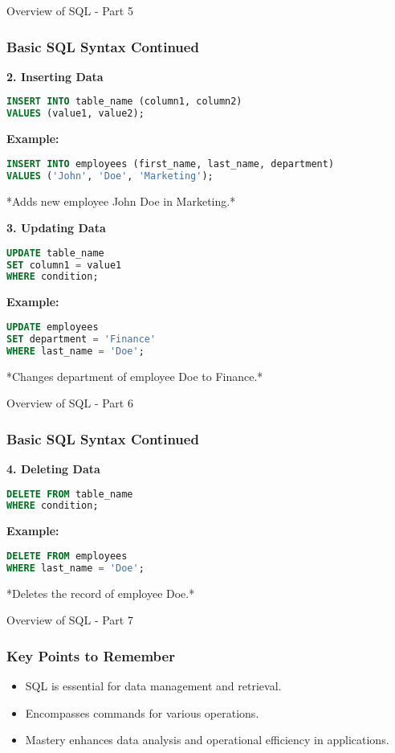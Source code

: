 \documentclass[aspectratio=169]{beamer}
\begin{document}
\begin{frame}[fragile]{Overview of SQL - Part 5}
    \frametitle{Basic SQL Syntax Continued}

    \textbf{2. Inserting Data}
    \begin{lstlisting}[language=SQL]
INSERT INTO table_name (column1, column2) 
VALUES (value1, value2);
    \end{lstlisting}

    \textbf{Example:}
    \begin{lstlisting}[language=SQL]
INSERT INTO employees (first_name, last_name, department) 
VALUES ('John', 'Doe', 'Marketing');
    \end{lstlisting}
    *Adds new employee John Doe in Marketing.*

    \textbf{3. Updating Data}
    \begin{lstlisting}[language=SQL]
UPDATE table_name 
SET column1 = value1 
WHERE condition;
    \end{lstlisting}

    \textbf{Example:}
    \begin{lstlisting}[language=SQL]
UPDATE employees 
SET department = 'Finance' 
WHERE last_name = 'Doe';
    \end{lstlisting}
    *Changes department of employee Doe to Finance.*
\end{frame}

\begin{frame}[fragile]{Overview of SQL - Part 6}
    \frametitle{Basic SQL Syntax Continued}

    \textbf{4. Deleting Data}
    \begin{lstlisting}[language=SQL]
DELETE FROM table_name 
WHERE condition;
    \end{lstlisting}

    \textbf{Example:}
    \begin{lstlisting}[language=SQL]
DELETE FROM employees 
WHERE last_name = 'Doe';
    \end{lstlisting}
    *Deletes the record of employee Doe.*
\end{frame}

\begin{frame}{Overview of SQL - Part 7}
    \frametitle{Key Points to Remember}
    \begin{itemize}
        \item SQL is essential for data management and retrieval.
        \item Encompasses commands for various operations.
        \item Mastery enhances data analysis and operational efficiency in applications.
    \end{itemize}
\end{frame}
\end{document}
